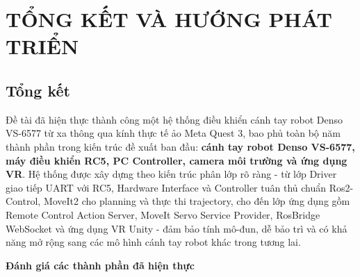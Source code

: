 \chapter{TỔNG KẾT VÀ HƯỚNG PHÁT TRIỂN}
\section{Tổng kết}

Đề tài đã hiện thực thành công một hệ thống điều khiển cánh tay robot Denso VS-6577 từ xa thông qua kính thực tế ảo Meta Quest 3, bao phủ toàn bộ năm thành phần trong kiến trúc đề xuất ban đầu: \textbf{cánh tay robot Denso VS-6577, máy điều khiển RC5, PC Controller, camera môi trường và ứng dụng VR}. Hệ thống được xây dựng theo kiến trúc phân lớp rõ ràng - từ lớp Driver giao tiếp UART với RC5, Hardware Interface và Controller tuân thủ chuẩn Ros2-Control, MoveIt2 cho planning và thực thi trajectory, cho đến lớp ứng dụng gồm Remote Control Action Server, MoveIt Servo Service Provider, RosBridge WebSocket và ứng dụng VR Unity - đảm bảo tính mô-đun, dễ bảo trì và có khả năng mở rộng sang các mô hình cánh tay robot khác trong tương lai.

\textbf{Đánh giá các thành phần đã hiện thực}

